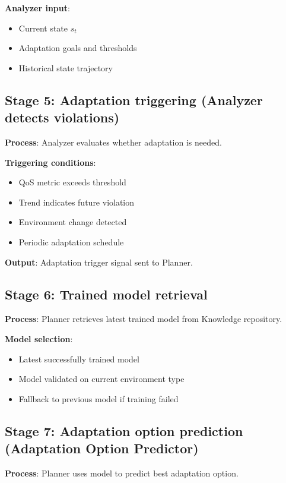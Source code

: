 \documentclass[11pt,a4paper]{article}
\begin{document}
\textbf{Analyzer input}:
\begin{itemize}
    \item Current state $s_t$
    \item Adaptation goals and thresholds
    \item Historical state trajectory
\end{itemize}

\subsection{Stage 5: Adaptation triggering (Analyzer detects violations)}

\textbf{Process}: Analyzer evaluates whether adaptation is needed.

\textbf{Triggering conditions}:
\begin{itemize}
    \item QoS metric exceeds threshold
    \item Trend indicates future violation
    \item Environment change detected
    \item Periodic adaptation schedule
\end{itemize}

\textbf{Output}: Adaptation trigger signal sent to Planner.

\subsection{Stage 6: Trained model retrieval}

\textbf{Process}: Planner retrieves latest trained model from Knowledge repository.

\textbf{Model selection}:
\begin{itemize}
    \item Latest successfully trained model
    \item Model validated on current environment type
    \item Fallback to previous model if training failed
\end{itemize}

\subsection{Stage 7: Adaptation option prediction (Adaptation Option Predictor)}

\textbf{Process}: Planner uses model to predict best adaptation option.
\end{document}
